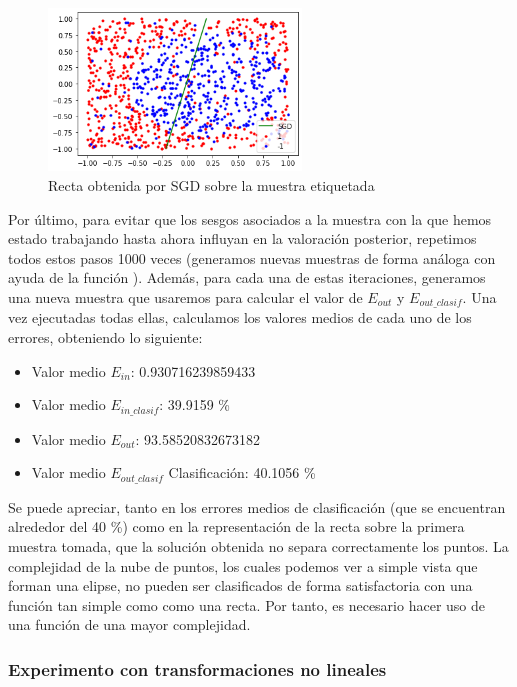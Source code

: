 \documentclass[10pt,a4paper]{article}
\begin{document}
\begin{figure}[h]
	\centering
	\includegraphics[width=0.6\textwidth]{ej2.2_sgd_lineal}
	\caption{Recta obtenida por SGD sobre la muestra etiquetada}
	\label{fig:ej2.2_sgd_lineal}
\end{figure}

Por último, para evitar que los sesgos asociados a la muestra con la que hemos estado trabajando hasta ahora influyan en la valoración posterior, repetimos todos estos pasos 1000 veces (generamos nuevas muestras de forma análoga con ayuda de la función ). Además, para cada una de estas iteraciones, generamos una nueva muestra que usaremos para calcular el valor de $E_{out}$ y $E_{out\_clasif}$. Una vez ejecutadas todas ellas, calculamos los valores medios de cada uno de los errores, obteniendo lo siguiente:

\begin{itemize}
	\item Valor medio $E_{in}$: 0.930716239859433
	\item Valor medio $E_{in\_clasif}$: 39.9159 \%
	\item Valor medio $E_{out}$: 93.58520832673182
	\item Valor medio $E_{out\_clasif}$ Clasificación: 40.1056 \%
\end{itemize}


Se puede apreciar, tanto en los errores medios de clasificación (que se encuentran alrededor del 40 \%) como en la representación de la recta sobre la primera muestra tomada, que la solución obtenida no separa correctamente los puntos. La complejidad de la nube de puntos, los cuales podemos ver a simple vista que forman una elipse, no pueden ser clasificados de forma satisfactoria con una función tan simple como como una recta. Por tanto, es necesario hacer uso de una función de una mayor complejidad.



\subsubsection{Experimento con transformaciones no lineales}
\end{document}
